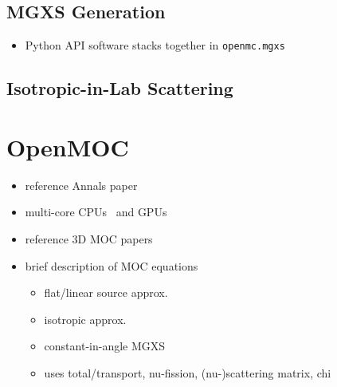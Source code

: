 \subsection{MGXS Generation}
\label{sec:chap3-mgxs}

\begin{itemize}[noitemsep]
  \item Python \ac{API} software stacks together in \texttt{openmc.mgxs}
\end{itemize}

\subsection{Isotropic-in-Lab Scattering}
\label{sec:chap3-iso-in-lab}


\section{OpenMOC}
\label{sec:chap3-openmoc}

\begin{itemize}[noitemsep]
  \item reference Annals paper~\cite{boyd2014openmoc}
  \item multi-core CPUs~\cite{boyd2016parallel} and GPUs~\cite{boyd2013massively}
  \item reference 3D \ac{MOC} papers
  \item brief description of \ac{MOC} equations
  \begin{itemize}[noitemsep]
    \item flat/linear source approx.
    \item isotropic approx.
    \item constant-in-angle \ac{MGXS}
    \item uses total/transport, nu-fission, (nu-)scattering matrix, chi
  \end{itemize}
\end{itemize}

